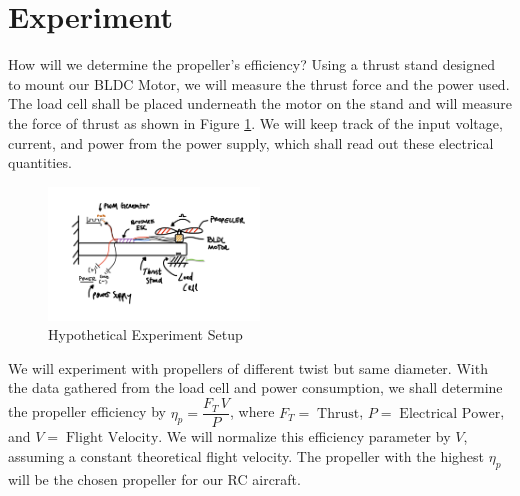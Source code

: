 \documentclass{article}
\begin{document}
\section{Experiment}
How will we determine the propeller's efficiency? Using a thrust stand designed to mount our BLDC Motor, we will measure the thrust force and the power used. The load cell shall be placed underneath the motor on the stand and will measure the force of thrust as shown in Figure \ref{fig:finalsetup}. We will keep track of the input voltage, current, and power from the power supply, which shall read out these electrical quantities.
\begin{figure}[H]
    \centering
    \includegraphics[width = 0.5\textwidth]{EMech_FinalExperiment_IdeaSetup.png}
    \caption{Hypothetical Experiment Setup}
    \label{fig:finalsetup}
\end{figure}
We will experiment with propellers of different twist but same diameter. With the data gathered from the load cell and power consumption, we shall determine the propeller efficiency by $\eta_{p} = \dfrac{F_{T}\, V}{P}$, where $F_{T} = \; \text{Thrust}$, $P = \; \text{Electrical Power}$, and $V = \; \text{Flight Velocity}$. We will normalize this efficiency parameter by $V$, assuming a constant theoretical flight velocity. The propeller with the highest $\eta_{p}$ will be the chosen propeller for our RC aircraft.
\newpage
\end{document}
